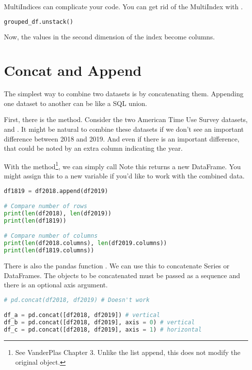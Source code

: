 \smallskip
\noindent MultiIndices can complicate your code. You can get rid of the MultiIndex with .

\begin{lstlisting}[language = Python]
grouped_df.unstack()
\end{lstlisting}

Now, the values in the second dimension of the index become columns.


\section{Concat and Append}


The simplest way to combine two datasets is by concatenating them. Appending one dataset to another can be like a SQL union. 

First, there is the  method. Consider the two American Time Use Survey datasets,  and . It might be natural to combine these datasets if we don't see an important difference between 2018 and 2019. And even if there is an important difference, that could be noted by an extra column indicating the year.

With the  method\footnote{See VanderPlas Chapter 3. Unlike the list append, this does not modify the original object.}, we can simply call  Note this returns a new DataFrame. You might assign this to a new variable if you'd like to work with the combined data.

\begin{lstlisting}[language = Python]
df1819 = df2018.append(df2019)

# Compare number of rows
print(len(df2018), len(df2019))
print(len(df1819))

# Compare number of columns
print(len(df2018.columns), len(df2019.columns))
print(len(df1819.columns))
\end{lstlisting}


There is also the pandas function . We can use this to concatenate Series or DataFrames. The objects to be concatenated must be passed as a sequence and there is an optional axis argument.

\begin{lstlisting}[language = Python]
# pd.concat(df2018, df2019) # Doesn't work

df_a = pd.concat([df2018, df2019]) # vertical
df_b = pd.concat([df2018, df2019], axis = 0) # vertical
df_c = pd.concat([df2018, df2019], axis = 1) # horizontal
\end{lstlisting}


